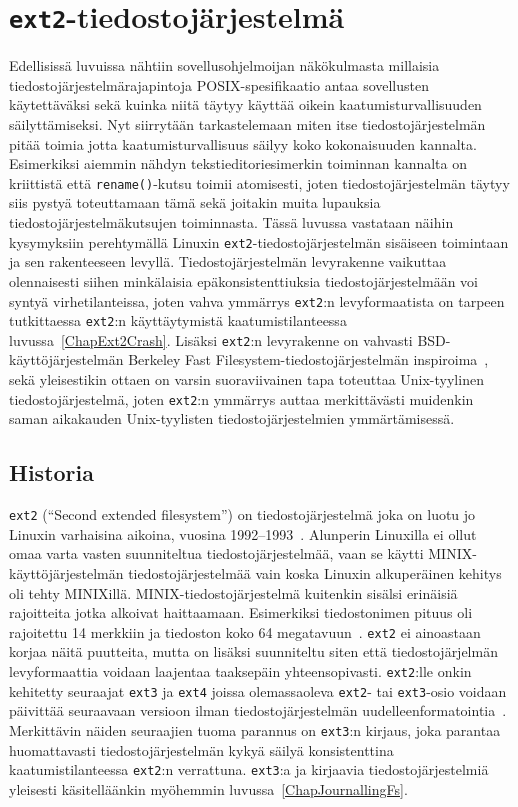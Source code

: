\section{\texttt{ext2}-tiedostojärjestelmä}
\label{ChapExt2Fs}
Edellisissä luvuissa nähtiin sovellusohjelmoijan näkökulmasta millaisia tiedostojärjestelmärajapintoja POSIX-spesifikaatio antaa sovellusten käytettäväksi sekä kuinka niitä täytyy käyttää oikein kaatumisturvallisuuden säilyttämiseksi.
Nyt siirrytään tarkastelemaan miten itse tiedostojärjestelmän pitää toimia jotta kaatumisturvallisuus säilyy koko kokonaisuuden kannalta.
Esimerkiksi aiemmin nähdyn tekstieditoriesimerkin toiminnan kannalta on kriittistä että \texttt{rename()}-kutsu toimii atomisesti,
joten tiedostojärjestelmän täytyy siis pystyä toteuttamaan tämä sekä joitakin muita lupauksia tiedostojärjestelmäkutsujen toiminnasta.
Tässä luvussa vastataan näihin kysymyksiin perehtymällä Linuxin \texttt{ext2}-tiedostojärjestelmän sisäiseen toimintaan ja sen rakenteeseen levyllä.
Tiedostojärjestelmän levyrakenne vaikuttaa olennaisesti siihen minkälaisia epäkonsistenttiuksia tiedostojärjestelmään voi syntyä virhetilanteissa,
joten vahva ymmärrys \texttt{ext2}:n levyformaatista on tarpeen tutkittaessa \texttt{ext2}:n käyttäytymistä kaatumistilanteessa luvussa~\ref{ChapExt2Crash}.
Lisäksi \texttt{ext2}:n levyrakenne on vahvasti BSD-käyttöjärjestelmän Berkeley Fast Filesystem-tiedostojärjestelmän inspiroima~\cite{Ext2Design},
sekä yleisestikin ottaen on varsin suoraviivainen tapa toteuttaa Unix-tyylinen tiedostojärjestelmä,
joten \texttt{ext2}:n ymmärrys auttaa merkittävästi muidenkin saman aikakauden Unix-tyylisten tiedostojärjestelmien ymmärtämisessä.

\subsection{Historia}

\texttt{ext2} (``Second extended filesystem'') on tiedostojärjestelmä joka on luotu jo Linuxin varhaisina aikoina, vuosina 1992--1993~\cite{Ext2Design}.
Alunperin Linuxilla ei ollut omaa varta vasten suunniteltua tiedostojärjestelmää,
vaan se käytti MINIX-käyttöjärjestelmän tiedostojärjestelmää vain koska Linuxin alkuperäinen kehitys oli tehty MINIXillä.
MINIX-tiedostojärjestelmä kuitenkin sisälsi erinäisiä rajoitteita jotka alkoivat haittaamaan.
Esimerkiksi tiedostonimen pituus oli rajoitettu 14 merkkiin ja tiedoston koko 64 megatavuun~\cite{Ext2Design}.
\texttt{ext2} ei ainoastaan korjaa näitä puutteita,
mutta on lisäksi suunniteltu siten että tiedostojärjelmän levyformaattia voidaan laajentaa taaksepäin yhteensopivasti.
\texttt{ext2}:lle onkin kehitetty seuraajat \texttt{ext3} ja \texttt{ext4} joissa olemassaoleva \texttt{ext2}- tai \texttt{ext3}-osio voidaan päivittää seuraavaan
versioon ilman tiedostojärjestelmän uudelleenformatointia~\cite{Ext4Status}.
Merkittävin näiden seuraajien tuoma parannus on \texttt{ext3}:n kirjaus,
joka parantaa huomattavasti tiedostojärjestelmän kykyä säilyä konsistenttina kaatumistilanteessa \texttt{ext2}:n verrattuna.
\texttt{ext3}:a ja kirjaavia tiedostojärjestelmiä yleisesti käsitelläänkin myöhemmin luvussa~\ref{ChapJournallingFs}.

